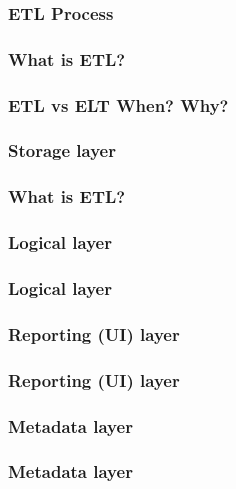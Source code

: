 \subsubsection{ETL Process}

\begin{frame}
\frametitle{What is ETL?}
\end{frame}
\begin{frame}
\frametitle{ETL vs ELT When? Why?}
\end{frame}

\subsubsection{Storage layer}

\begin{frame}
\frametitle{What is ETL?}
\end{frame}
\subsubsection{Logical layer}

\begin{frame}
\frametitle{Logical layer}
\end{frame}

\subsubsection{Reporting (UI) layer}

\begin{frame}
\frametitle{Reporting (UI) layer}
\end{frame}

\subsubsection{Metadata layer}

\begin{frame}
\frametitle{Metadata layer}
\end{frame}

